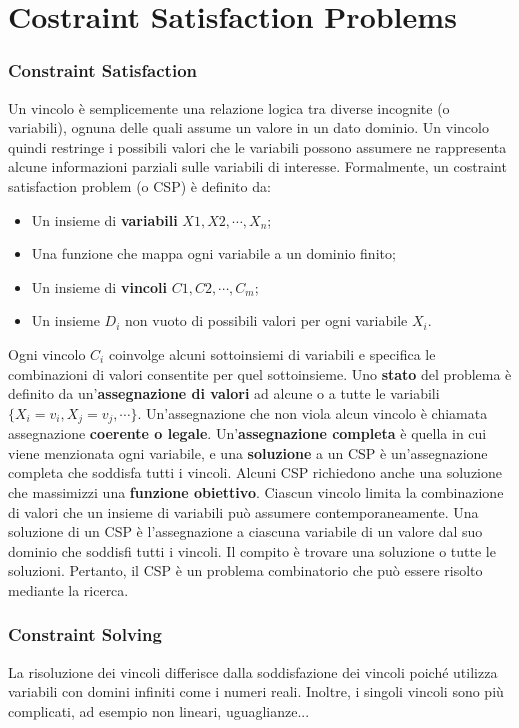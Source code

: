 \chapter*{Costraint Satisfaction Problems}
\subsection{Constraint Satisfaction}
Un vincolo è semplicemente una relazione logica tra diverse incognite (o variabili), ognuna delle quali assume un valore in un dato dominio. Un vincolo quindi restringe i possibili valori che le variabili possono assumere ne rappresenta alcune informazioni parziali sulle variabili di interesse. Formalmente, un costraint satisfaction problem (o CSP) è definito da:
\begin{itemize}
    \item Un insieme di \textbf{variabili} $X1, X2, \cdots , X_n$;
    \item Una funzione che mappa ogni variabile a un dominio finito;
    \item Un insieme di \textbf{vincoli} $C1, C2, \cdots, C_m$;
    \item Un insieme $D_i$ non vuoto di possibili valori per ogni variabile $X_i$.
\end{itemize}  
 Ogni vincolo $C_i$ coinvolge alcuni sottoinsiemi di variabili e specifica le combinazioni di valori consentite per quel sottoinsieme. Uno \textbf{stato} del problema è definito da un'\textbf{assegnazione di valori} ad alcune o a tutte le variabili $\{ X_i = v_i, X_j = v_j, \cdots\}$. Un'assegnazione che non viola alcun vincolo è chiamata assegnazione \textbf{coerente o legale}. Un'\textbf{assegnazione completa} è quella in cui viene menzionata ogni variabile, e una \textbf{soluzione} a un CSP è un'assegnazione completa che soddisfa tutti i vincoli. Alcuni CSP richiedono anche una soluzione che massimizzi una \textbf{funzione obiettivo}. Ciascun vincolo limita la combinazione di valori che un insieme di variabili può assumere contemporaneamente. Una soluzione di un CSP è l'assegnazione a ciascuna variabile di un valore dal suo dominio che soddisfi tutti i vincoli. Il compito è trovare una soluzione o tutte le soluzioni. Pertanto, il CSP è un problema combinatorio che può essere risolto mediante la ricerca.
\subsection{Constraint Solving} 
La risoluzione dei vincoli differisce dalla soddisfazione dei vincoli poiché utilizza variabili con domini infiniti come i numeri reali. Inoltre, i singoli vincoli sono più complicati, ad esempio non lineari, uguaglianze...
